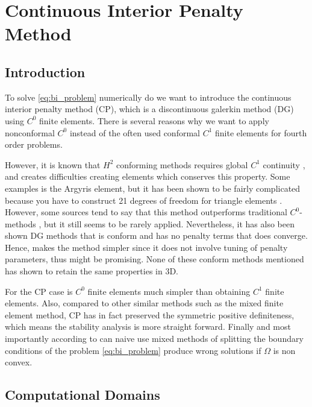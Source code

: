 \newpage
\section{Continuous Interior Penalty Method}%
\label{sec:continious_interior_penalty_method}



\subsection{Introduction}%
\label{sub:introduction}


To solve \eqref{eq:bi_problem} numerically do we want to introduce the continuous interior penalty method (CP), which is a discontinuous galerkin
method (DG) using $C^{0}$ finite elements. There is several reasons why we want to apply nonconformal $C^{0}$ instead of the often used conformal $C^{1}$ finite elements for fourth order problems.

However, it is known that $ H^{2}$ conforming methods requires global $C^{1}$ continuity \cite{ye19}, and creates difficulties creating elements which conserves this property. Some examples is the Argyris element, but it has been shown to be fairly
complicated because you have to construct 21 degrees of freedom for triangle elements \cite{ nair21, brenner07math}. However, some sources tend to say that this method outperforms traditional $C^{0}$- methods \cite{kirby18}, but it still seems to be rarely applied.
Nevertheless, it has also been shown DG methods that is conform and has no penalty terms that does converge\cite{ye19}. Hence, makes the method simpler since it does not involve tuning of penalty parameters, thus might be promising. None of these conform methods mentioned has shown to retain the same properties in 3D.

For the CP case is $C^0$ finite elements much simpler than obtaining $C^{1}$ finite elements. Also, compared to other similar methods such as the mixed finite element method, CP has in fact preserved the symmetric positive definiteness, which means the stability analysis is more straight forward. Finally and most importantly according to \cite{brenner2012quadratic} can naive use mixed methods of splitting the boundary conditions of
the problem \eqref{eq:bi_problem} produce wrong solutions if $\Omega $ is non convex.




\subsection{Computational Domains}%
\label{sub:computational_domain}

